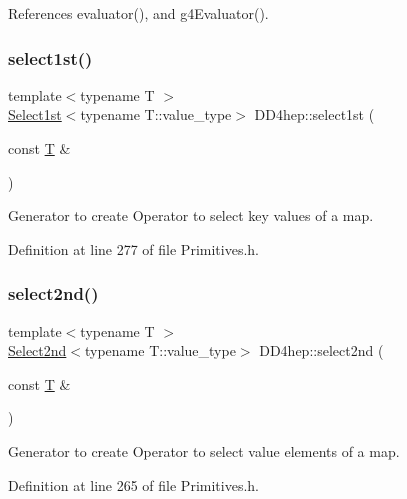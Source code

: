 References evaluator(), and g4\+Evaluator().

\hypertarget{namespace_d_d4hep_a213624c480553b45f428618f77e27d2f}{}\label{namespace_d_d4hep_a213624c480553b45f428618f77e27d2f} 
\subsubsection{\texorpdfstring{select1st()}{select1st()}}
{\footnotesize\ttfamily template$<$typename T $>$ \\
\hyperlink{class_d_d4hep_1_1_select1st}{Select1st}$<$typename T\+::value\+\_\+type$>$ D\+D4hep\+::select1st (\begin{DoxyParamCaption}\item[{const \hyperlink{class_t}{T} \&}]{ }\end{DoxyParamCaption})}



Generator to create Operator to select key values of a map. 



Definition at line 277 of file Primitives.\+h.

\hypertarget{namespace_d_d4hep_a22c05bed3f5fb9b01958d687af1cad65}{}\label{namespace_d_d4hep_a22c05bed3f5fb9b01958d687af1cad65} 
\subsubsection{\texorpdfstring{select2nd()}{select2nd()}}
{\footnotesize\ttfamily template$<$typename T $>$ \\
\hyperlink{class_d_d4hep_1_1_select2nd}{Select2nd}$<$typename T\+::value\+\_\+type$>$ D\+D4hep\+::select2nd (\begin{DoxyParamCaption}\item[{const \hyperlink{class_t}{T} \&}]{ }\end{DoxyParamCaption})}



Generator to create Operator to select value elements of a map. 



Definition at line 265 of file Primitives.\+h.

\hypertarget{namespace_d_d4hep_a598efc9dd592c6ab1dd96be38bf5f9f8}{}\label{namespace_d_d4hep_a598efc9dd592c6ab1dd96be38bf5f9f8} 
